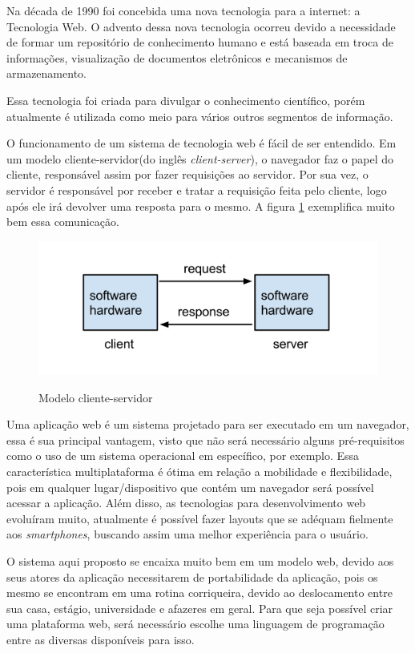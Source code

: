 Na década de 1990 foi concebida uma nova tecnologia para a internet: a Tecnologia Web\cite{zaneti2005construcao}. O advento dessa nova tecnologia ocorreu devido a necessidade de formar um repositório de conhecimento humano \cite{lee1994www} e está baseada em troca de informações, visualização de documentos eletrônicos e mecanismos de armazenamento. \par
Essa tecnologia foi criada para divulgar o conhecimento científico, porém atualmente é utilizada como meio para vários outros segmentos de informação\cite{zaneti2005construcao}. \par
O funcionamento de um sistema de tecnologia web é fácil de ser entendido. Em um modelo cliente-servidor(do inglês \textit{client-server}), o navegador faz o papel do cliente, responsável assim por fazer requisições ao servidor. Por sua vez, o servidor é responsável por receber e tratar a requisição feita pelo cliente, logo após ele irá devolver uma resposta para o mesmo\cite{sousa2016desenvolvimento}. A figura \ref{fig:web} exemplifica muito bem essa comunicação.

\begin{figure}[htbp!]
  \centering
  \caption{Modelo cliente-servidor}
  \includegraphics[width=1\textwidth]{figs/web.png}
    \label{fig:web}
\end{figure}

Uma aplicação web é um sistema projetado para ser executado em um navegador, essa é sua principal vantagem, visto que não será necessário alguns pré-requisitos como o uso de um sistema operacional em específico, por exemplo. Essa característica multiplataforma é ótima em relação a mobilidade e flexibilidade, pois em qualquer lugar/dispositivo que contém um navegador será possível acessar a aplicação. Além disso, as tecnologias para desenvolvimento web evoluíram muito, atualmente é possível fazer layouts que se adéquam fielmente aos \textit{smartphones}, buscando assim uma melhor experiência para o usuário\cite{pandey2013responsive}. \par
O sistema aqui proposto se encaixa muito bem em um modelo web, devido aos seus atores da aplicação necessitarem de portabilidade da aplicação, pois os mesmo se encontram em uma rotina corriqueira, devido ao deslocamento entre sua casa, estágio, universidade e afazeres em geral. Para que seja possível criar uma plataforma web, será necessário escolhe uma linguagem de programação entre as diversas disponíveis para isso.


